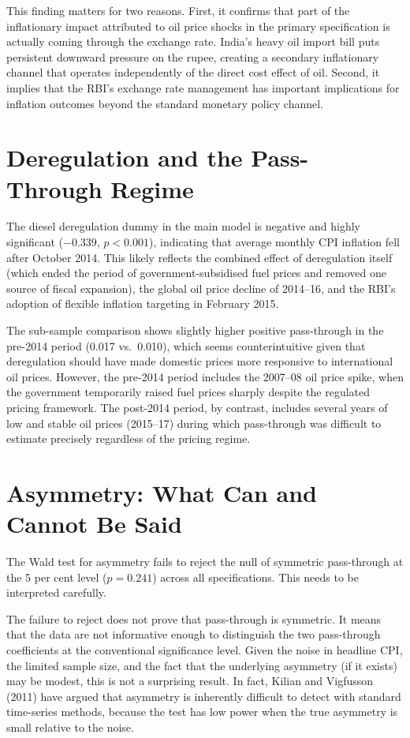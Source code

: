 This finding matters for two reasons. First, it confirms that part of the inflationary impact attributed to oil price shocks in the primary specification is actually coming through the exchange rate. India's heavy oil import bill puts persistent downward pressure on the rupee, creating a secondary inflationary channel that operates independently of the direct cost effect of oil. Second, it implies that the RBI's exchange rate management has important implications for inflation outcomes beyond the standard monetary policy channel.

\section{Deregulation and the Pass-Through Regime}

The diesel deregulation dummy in the main model is negative and highly significant ($-0.339$, $p < 0.001$), indicating that average monthly CPI inflation fell after October 2014. This likely reflects the combined effect of deregulation itself (which ended the period of government-subsidised fuel prices and removed one source of fiscal expansion), the global oil price decline of 2014--16, and the RBI's adoption of flexible inflation targeting in February 2015.

The sub-sample comparison shows slightly higher positive pass-through in the pre-2014 period (0.017 vs.\ 0.010), which seems counterintuitive given that deregulation should have made domestic prices more responsive to international oil prices. However, the pre-2014 period includes the 2007--08 oil price spike, when the government temporarily raised fuel prices sharply despite the regulated pricing framework. The post-2014 period, by contrast, includes several years of low and stable oil prices (2015--17) during which pass-through was difficult to estimate precisely regardless of the pricing regime.

\section{Asymmetry: What Can and Cannot Be Said}

The Wald test for asymmetry fails to reject the null of symmetric pass-through at the 5 per cent level ($p = 0.241$) across all specifications. This needs to be interpreted carefully.

The failure to reject does not prove that pass-through is symmetric. It means that the data are not informative enough to distinguish the two pass-through coefficients at the conventional significance level. Given the noise in headline CPI, the limited sample size, and the fact that the underlying asymmetry (if it exists) may be modest, this is not a surprising result. In fact, Kilian and Vigfusson (2011) have argued that asymmetry is inherently difficult to detect with standard time-series methods, because the test has low power when the true asymmetry is small relative to the noise.

